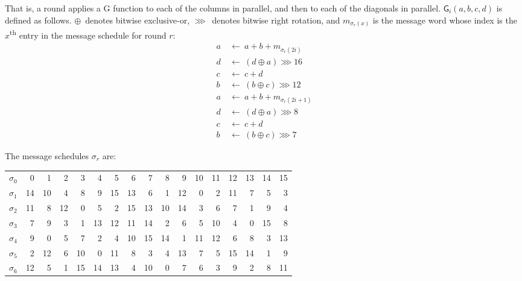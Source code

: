 \documentclass[11pt,notitlepage,a4paper]{article}
\newcommand{\GG}{\mathsf{G}}
\begin{document}
\begin{appendices}
    That is, a round applies a G function to each of the columns in parallel,
    and then to each of the diagonals in parallel. $\GG_i(a, b, c, d)$ is
    defined as follows. $\oplus$~denotes bitwise exclusive-or, $\ggg$~denotes
    bitwise right rotation, and $m_{\sigma_r(x)}$ is the message word whose
    index is the $x$\textsuperscript{th} entry in the message schedule for
    round $r$:
\begin{align*}
    a \ & \leftarrow \ a + b + m_{\sigma_r(2i)} \\
    d \ & \leftarrow \ (d \oplus a) \ggg 16 \\
    c \ & \leftarrow \ c + d \\
    b \ & \leftarrow \ (b \oplus c) \ggg 12 \\
    a \ & \leftarrow \ a + b + m_{\sigma_r(2i+1)} \\
    d \ & \leftarrow \ (d \oplus a) \ggg 8 \\
    c \ & \leftarrow \ c + d \\
    b \ & \leftarrow \ (b \oplus c) \ggg 7
\end{align*}

    The message schedules $\sigma_r$ are:

\begin{center}
\begin{tabular}{ | r | r r r r r r r r r r r r r r r r | }
    \hline
    $\sigma_0$ & 0 & 1 & 2 & 3 & 4 & 5 & 6 & 7 & 8 & 9 & 10 & 11 & 12 & 13 & 14 & 15 \\
    $\sigma_1$ & 14 & 10 & 4 & 8 & 9 & 15 & 13 & 6 & 1 & 12 & 0 & 2 & 11 & 7 & 5 & 3 \\
    $\sigma_2$ & 11 & 8 & 12 & 0 & 5 & 2 & 15 & 13 & 10 & 14 & 3 & 6 & 7 & 1 & 9 & 4 \\
    $\sigma_3$ & 7 & 9 & 3 & 1 & 13 & 12 & 11 & 14 & 2 & 6 & 5 & 10 & 4 & 0 & 15 & 8 \\
    $\sigma_4$ & 9 & 0 & 5 & 7 & 2 & 4 & 10 & 15 & 14 & 1 & 11 & 12 & 6 & 8 & 3 & 13 \\
    $\sigma_5$ & 2 & 12 & 6 & 10 & 0 & 11 & 8 & 3 & 4 & 13 & 7 & 5 & 15 & 14 & 1 & 9 \\
    $\sigma_6$ & 12 & 5 & 1 & 15 & 14 & 13 & 4 & 10 & 0 & 7 & 6 & 3 & 9 & 2 & 8 & 11 \\
    \hline
\end{tabular}
\end{center}

\end{appendices}
\end{document}
